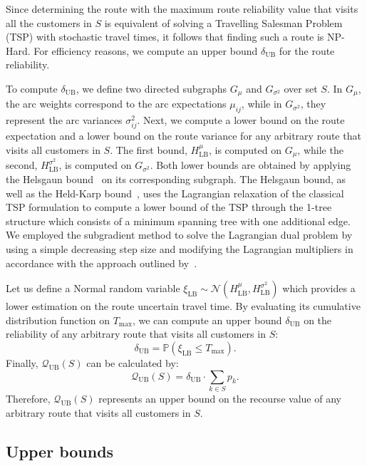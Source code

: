 \documentclass[11pt]{article}
\theoremstyle{definition}
\begin{document}
Since determining the route with the maximum route reliability value that visits all the customers in $S$ is equivalent of solving a Travelling Salesman Problem (TSP) with stochastic travel times, it follows that finding such a route is NP-Hard. For efficiency reasons, we compute an upper bound $\delta_{\text{UB}}$ for the route reliability.

To compute $\delta_{\text{UB}}$, we define two directed subgraphs $G_{\mu}$ and $G_{\sigma^2}$ over set $S$.
%
In $G_{\mu}$, the arc weights correspond to the arc expectations $\mu_{ij}$, while in $G_{\sigma^2}$, they represent the arc variances $\sigma^2_{ij}$. Next, we compute a lower bound on the route expectation and a lower bound on the route variance for any arbitrary route that visits all customers in $S$. The first bound, $H^{\mu}_{\mathrm{LB}}$, is computed on $G_{\mu}$, while the second, $H^{\sigma^2}_{\mathrm{LB}}$, is computed on $G_{\sigma^2}$. Both lower bounds are obtained by applying the Helsgaun bound~\citep{Helsgaun2000} on its corresponding subgraph.
%
The Helsgaun bound, as well as the Held-Karp bound~\citep{Held1970}, uses the Lagrangian relaxation of the classical TSP formulation to compute a lower bound of the TSP through the 1-tree structure which consists of a minimum spanning tree with one additional edge. We employed the subgradient method to solve the Lagrangian dual problem by using a simple decreasing step size and modifying the Lagrangian multipliers in accordance with the approach outlined by~\cite{Volgenant1982}.

Let us define a Normal random variable $\xi_{\text{LB}} \sim \mathcal{N}(H^{\mu}_{\text{LB}}, H^{\sigma^2}_{\text{LB}})$ which provides a lower estimation on the route uncertain travel time. By evaluating its cumulative distribution function on $T_{\max}$, we can compute an upper bound $\delta_{\text{UB}}$ on the reliability of any arbitrary route that visits all customers in $S$:
%
\[\delta_{\text{UB}} = \mathbb{P}(\xi_{\text{LB}} \leq T_{\max}).\]
%
Finally, $\mathcal{Q}_{\text{UB}}(S)$ can be calculated by:
%
\[\mathcal{Q}_{\text{UB}}(S) = \delta_{\text{UB}} \cdot \sum_{k \in S} p_k.\]
%
Therefore, $\mathcal{Q}_{\text{UB}}(S)$ represents an upper bound on the recourse value of any arbitrary route that visits all customers in $S$.

\subsection{Upper bounds}
\label{ssec:bounds}
\end{document}
